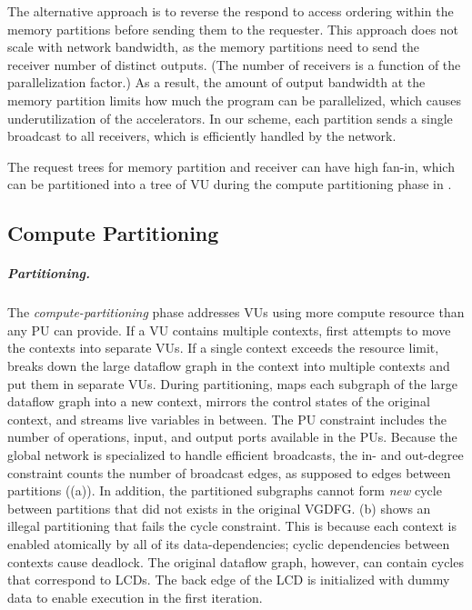 The alternative approach is to reverse the respond to access ordering within the memory partitions before sending them to the requester.
This approach does not scale with network bandwidth, as the memory partitions need to send the receiver number of distinct outputs.
(The number of receivers is a function of the parallelization factor.) 
As a result, the amount of output bandwidth at the memory partition limits how much the program can be parallelized, which causes underutilization of the accelerators.
In our scheme, each partition sends a single broadcast to all receivers, which is efficiently handled by the network.

The request trees for memory partition and receiver can have high fan-in, which can 
be partitioned into a tree of VU during the compute partitioning phase in .

\subsection{Compute Partitioning} 
\label{sec:compsplit}

\subparagraph{Partitioning.}
The {\em compute-partitioning} phase addresses VUs using more compute resource than any PU can provide. 
If a VU contains multiple contexts, \name{} first attempts to move the contexts into separate VUs.
If a single context exceeds the resource limit, \name{} breaks down the large dataflow graph in the context into multiple contexts and put them in separate VUs.
During partitioning, \name{} maps each subgraph of the large dataflow graph into a new context, mirrors the control states of the original context, and streams live variables in between.
The PU constraint includes the number of operations, input, and output ports available in the PUs.
Because the global network is specialized to handle efficient broadcasts, the in- and out-degree constraint counts the number of broadcast edges, as supposed to edges between partitions ((a)).
In addition, the partitioned subgraphs cannot form {\em new} cycle between partitions that did not exists in the original VGDFG. 
 (b) shows an illegal partitioning that fails the cycle constraint.
This is because each context is enabled atomically by all of its data-dependencies; cyclic dependencies between contexts cause deadlock.
The original dataflow graph, however, can contain cycles that correspond to LCDs.
The back edge of the LCD is initialized with dummy data to enable execution in the first iteration.

